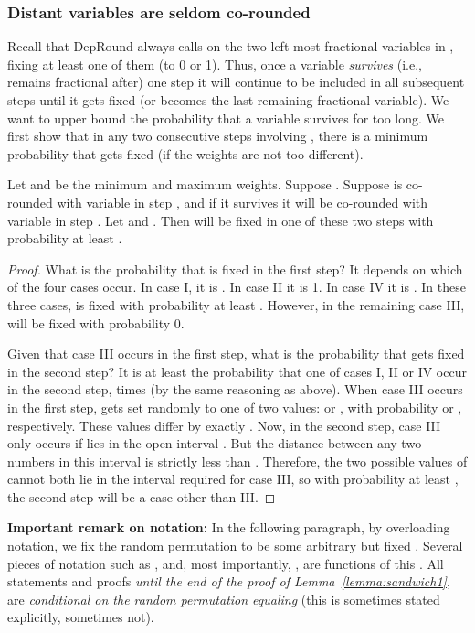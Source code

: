 \subsubsection{Distant variables are seldom co-rounded}
Recall that {\sc DepRound} always calls  on the two left-most fractional variables in , fixing at least one of them (to 0 or 1). Thus, once a variable \emph{survives} (i.e., remains fractional after) one step it will continue to be included in all subsequent  steps until it gets fixed (or becomes the last remaining fractional variable). We want to upper bound the probability that a variable survives for too long. We first show that in any two consecutive steps involving , there is a minimum probability that  gets fixed (if the weights are not too different).
\begin{lemma}\label{lemma:pair-prob}
Let  and  be the minimum and maximum weights. Suppose . 
Suppose  is co-rounded with variable  in step , and if it survives it will be co-rounded with variable  in step . Let  and . 
Then  will be fixed in one of these two steps with probability at least .
\end{lemma}
\begin{proof}
What is the probability that  is fixed in the first step? It depends on which of the four cases occur. In case I, it is . In case II it is 1. In case IV it is . In these three cases,  is fixed with probability at least . However, in the remaining case III,  will be fixed with probability 0. 

Given that case III occurs in the first step, what is the probability that  gets fixed in the second step? It is at least the probability that one of cases I, II or IV occur in the second step, times  (by the same reasoning as above). When case III occurs in the first step,  gets set randomly to one of two values:  or , with probability  or , respectively.  These values differ by exactly . 
Now, in the second step, case III only occurs if  lies in the open interval . But the distance between any two numbers in this interval is strictly less than . Therefore, the two possible values of  cannot both lie in the interval required for case III, so with probability at least , the second step will be a case other than III. 
\end{proof} 

\smallskip \noindent \textbf{Important remark on notation:} In the following paragraph, by overloading notation, we fix the random permutation  to be some arbitrary but fixed . Several pieces of notation such as , and, most importantly, 
, are functions of this . All statements and proofs \emph{until the end of the proof of Lemma~\ref{lemma:sandwich1}}, are \emph{conditional on the random permutation equaling } (this is sometimes stated explicitly, sometimes not). 

